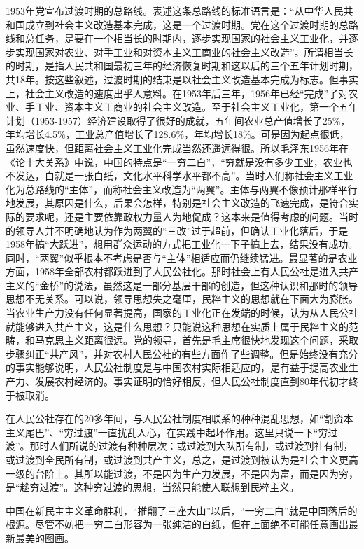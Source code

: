 \documentclass[UTF8, 12pt, a4paper]{ctexrep}
\begin{document}
1953年党宣布过渡时期的总路线。表述这条总路线的标准语言是：“从中华人民共和国成立到社会主义改造基本完成，这是一个过渡时期。党在这个过渡时期的总路线和总任务，是要在一个相当长的时期内，逐步实现国家的社会主义工业化，并逐步实现国家对农业、对手工业和对资本主义工商业的社会主义改造”。所谓相当长的时期，是指人民共和国最初三年的经济恢复时期和这以后的三个五年计划时期，共18年。按这些叙述，过渡时期的结束是以社会主义改造基本完成为标志。但事实上，社会主义改造的速度出乎人意料。在1953年后三年，1956年已经“完成”了对农业、手工业、资本主义工商业的社会主义改造。至于社会主义工业化，第一个五年计划（1953-1957）经济建设取得了很好的成就，五年间农业总产值增长了25\%，年均增长4.5\%，工业总产值增长了128.6\%，年均增长18\%。可是因为起点很低，虽然速度快，但距离社会主义工业化完成当然还遥远得很。所以毛泽东1956年在《论十大关系》中说，中国的特点是“一穷二白”，“穷就是没有多少工业，农业也不发达，白就是一张白纸，文化水平科学水平都不高”。当时人们称社会主义工业化为总路线的“主体”，而称社会主义改造为“两翼”。主体与两翼不像预计那样平行地发展，其原因是什么，后果会怎样，特别是社会主义改造的飞速完成，是符合实际的要求呢，还是主要依靠政权力量人为地促成？这本来是值得考虑的问题。当时的领导人并不明确地认为作为两翼的“三改”过于超前，但确认工业化落后，于是1958年搞“大跃进”，想用群众运动的方式把工业化一下子搞上去，结果没有成功。同时，“两翼”似乎根本不考虑是否与“主体”相适应而仍继续猛进。最显著的是农业方面，1958年全部农村都跃进到了人民公社化。那时社会上有人民公社是进入共产主义的“金桥”的说法，虽然这是一部分基层干部的创造，但这种认识和那时的领导思想不无关系。可以说，领导思想失之毫厘，民粹主义的思想就在下面大为膨胀。当农业生产力没有任何显著提高，国家的工业化正在发端的时候，认为从人民公社就能够进入共产主义，这是什么思想？只能说这种思想在实质上属于民粹主义的范畴，和马克思主义距离很远。党的领导，首先是毛主席很快地发现这个问题，采取步骤纠正“共产风”，并对农村人民公社的有些方面作了些调整。但是始终没有充分的事实能够说明，人民公社制度是与中国农村实际相适应的，是有益于提高农业生产力、发展农村经济的。事实证明的恰好相反，但人民公社制度直到80年代初才终于被取消。

在人民公社存在的20多年间，与人民公社制度相联系的种种混乱思想，如“割资本主义尾巴”、“穷过渡”一直扰乱人心，在实践中起坏作用。这里只说一下“穷过渡”。那时人们所说的过渡有种种层次：或过渡到大队所有制，或过渡到社有制，或过渡到全民所有制，或过渡到共产主义，总之，是过渡到被认为是社会主义更高一级的台阶上。其所以能过渡，不是因为生产力发展，不是因为富，而是因为穷，是“趁穷过渡”。这种穷过渡的思想，当然只能使人联想到民粹主义。

中国在新民主主义革命胜利，“推翻了三座大山”以后，“一穷二白”就是中国落后的根源。尽管不妨把一穷二白形容为一张纯洁的白纸，但在上面绝不可能任意画出最新最美的图画。
\end{document}
